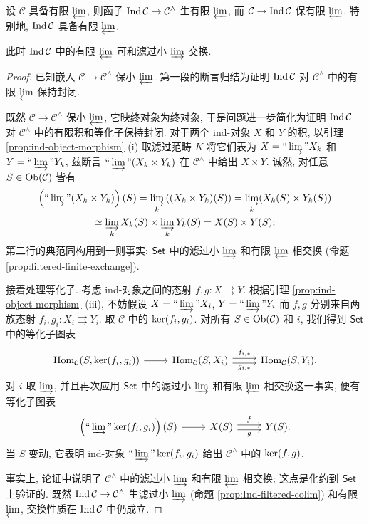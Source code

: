 \begin{lemma}\label{prop:Ind-lim}
	设 $\mathcal{C}$ 具备有限 $\varprojlim$, 则函子 $\operatorname{Ind}\mathcal{C} \to \mathcal{C}^\wedge$ 生有限 $\varprojlim$, 而 $\mathcal{C} \to \operatorname{Ind}\mathcal{C}$ 保有限 $\varprojlim$, 特别地, $\operatorname{Ind}\mathcal{C}$ 具备有限 $\varprojlim$.
	
	此时 $\operatorname{Ind}\mathcal{C}$ 中的有限 $\varprojlim$ 可和滤过小 $\varinjlim$ 交换.
\end{lemma}
\begin{proof}
	已知嵌入 $\mathcal{C} \to \mathcal{C}^\wedge$ 保小 $\varprojlim$. 第一段的断言归结为证明 $\operatorname{Ind}\mathcal{C}$ 对 $\mathcal{C}^\wedge$ 中的有限 $\varprojlim$ 保持封闭.
	
	既然 $\mathcal{C} \to \mathcal{C}^\wedge$ 保小 $\varprojlim$, 它映终对象为终对象, 于是问题进一步简化为证明 $\operatorname{Ind}\mathcal{C}$ 对 $\mathcal{C}^\wedge$ 中的有限积和等化子保持封闭. 对于两个 ind-对象 $X$ 和 $Y$ 的积, 以引理 \ref{prop:ind-object-morphism} (i) 取滤过范畴 $K$ 将它们表为 $X = \Yinjlim X_k$ 和 $Y = \Yinjlim Y_k$, 兹断言 $\Yinjlim (X_k \times Y_k)$ 在 $\mathcal{C}^\wedge$ 中给出 $X \times Y$. 诚然, 对任意 $S \in \operatorname{Ob}(\mathcal{C})$ 皆有
	\begin{multline*}
		\left(\Yinjlim (X_k \times Y_k)\right)(S) = \varinjlim_k \left((X_k \times Y_k)(S)\right) = \varinjlim_k (X_k(S) \times Y_k(S)) \\
		\simeq \varinjlim_k X_k(S) \times \varinjlim_k Y_k(S) = X(S) \times Y(S);
	\end{multline*}
	第二行的典范同构用到一则事实: $\mathsf{Set}$ 中的滤过小 $\varinjlim$ 和有限 $\varprojlim$ 相交换 (命题 \ref{prop:filtered-finite-exchange}).
	
	接着处理等化子. 考虑 ind-对象之间的态射 $f, g: X \rightrightarrows Y$. 根据引理 \ref{prop:ind-object-morphism} (iii), 不妨假设 $X = \Yinjlim X_i$, $Y = \Yinjlim Y_i$ 而 $f, g$ 分别来自两族态射 $f_i, g_i: X_i \rightrightarrows Y_i$. 取 $\mathcal{C}$ 中的 $\operatorname{ker}(f_i, g_i)$. 对所有 $S \in \operatorname{Ob}(\mathcal{C})$ 和 $i$, 我们得到 $\mathsf{Set}$ 中的等化子图表
	\[\begin{tikzcd}
		\Hom_{\mathcal{C}}(S, \Ker(f_i, g_i)) \arrow[r] & \Hom_{\mathcal{C}}(S, X_i) \arrow[r, shift left, "{f_{i, *}}"] \arrow[r, shift right, "{g_{i, *}}"'] & \Hom_{\mathcal{C}}(S, Y_i).
	\end{tikzcd}\]
	对 $i$ 取 $\varinjlim$, 并且再次应用 $\mathsf{Set}$ 中的滤过小 $\varinjlim$ 和有限 $\varprojlim$ 相交换这一事实, 便有等化子图表
	\[\begin{tikzcd}
		\left(\Yinjlim \Ker(f_i, g_i)\right)(S) \arrow[r] & X(S) \arrow[r, shift left, "f"] \arrow[r, shift right, "g"'] & Y(S).
	\end{tikzcd}\]
	当 $S$ 变动, 它表明 ind-对象 $\Yinjlim \Ker(f_i, g_i)$ 给出 $\mathcal{C}^\wedge$ 中的 $\operatorname{ker}(f, g)$.
	
	事实上, 论证中说明了 $\mathcal{C}^\wedge$ 中的滤过小 $\varinjlim$ 和有限 $\varprojlim$ 相交换; 这点是化约到 $\mathsf{Set}$ 上验证的. 既然 $\operatorname{Ind}\mathcal{C} \to \mathcal{C}^\wedge$ 生滤过小 $\varinjlim$ (命题 \ref{prop:Ind-filtered-colim}) 和有限 $\varprojlim$, 交换性质在 $\operatorname{Ind}\mathcal{C}$ 中仍成立.
\end{proof}

